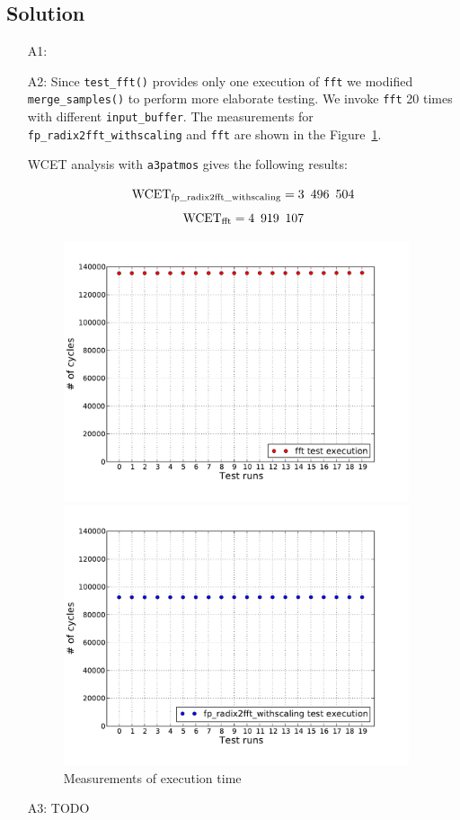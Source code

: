 \documentclass[12pt,a4paper,titlepage,oneside]{article}
\begin{document}
\subsection{Solution}
\begin{itemize}
\item[A1:] 


\item[A2:] 
  Since \texttt{test\_fft()} provides only one execution of
  \texttt{fft} we modified  \texttt{merge\_samples()} to
  perform more elaborate testing. We invoke \texttt{fft} 20 times
  with different \texttt{input\_buffer}.
  The measurements for \texttt{fp\_radix2fft\_withscaling} and \texttt{fft} are
  shown in the Figure~\ref{fig:fft_radix}.
  
  WCET analysis with \texttt{a3patmos} gives the following results:

  $$\text{WCET}_{\text{fp\_radix2fft\_withscaling}} = 3\enskip 496\enskip 504$$
  $$\text{WCET}_{\text{fft}} = 4\enskip 919\enskip 107$$

\begin{figure}%
\centering
  \begin{minipage}{0.8\textwidth}
	\includegraphics[width=4in]{fft_test}
  \end{minipage}
  \begin{minipage}{0.8\textwidth}
	\includegraphics[width=4in]{radix2fft}
  \end{minipage}
\caption{Measurements of execution time}
\label{fig:fft_radix}
\end{figure}


\item[A3:] 
  TODO

\end{itemize}
\end{document}
